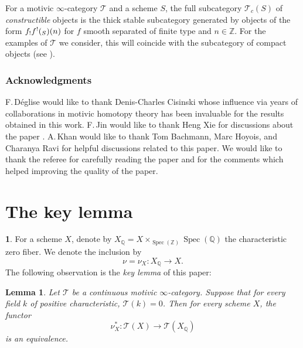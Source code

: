 \documentclass[11pt]{article}
\makeatletter
\numberwithin{equation}{section}\renewcommand{\encodingdefault}{TU}
\DeclareRobustCommand{\mathbbm}[1]{\csname jepbb@#1\endcsname}
\newcommand{\T}{\mathscr T}
\newcommand{\un}{\mathbbm 1}
\DeclareMathOperator{\spec}{Spec}
\newcommand{\ZZ} {\mathbb Z}
\newcommand{\QQ} {\mathbb Q}
\newtheorem{lm}[thm]{Lemma}
\theoremstyle{remark}
\theoremstyle{definition}
\newtheorem{num}[thm]{}
\numberwithin{equation}{thm}
\makeatother
\begin{document}
For a motivic $\infty$-category $\T$ and a scheme $S$, the full subcategory $\T_c(S)$ of \emph{constructible} objects is the thick stable subcategory generated by objects of the form $f_!f^!(\un_S)(n)$ for $f$ smooth separated of finite type and $n \in \ZZ$.
For the examples of $\T$ we consider, this will coincide with the subcategory of compact objects (see \cite[Prop.\,1.4.11]{CD3}).

\subsubsection*{Acknowledgments}
F.\,Déglise would like to thank Denis-Charles Cisinski whose influence via years of collaborations in motivic homotopy theory
has been invaluable for the results obtained in this work.
F.\,Jin would like to thank Heng Xie for discussions about the paper \cite{Jacobson}.
A.\,Khan would like to thank Tom Bachmann, Marc Hoyois, and Charanya Ravi for helpful discussions related to this paper. We would like to thank the referee for carefully reading the paper and for the comments which helped improving the quality of the paper.

\section{The key lemma}
\label{sec:key}

\begin{num}\label{num:zero_part}
For a scheme $X$, denote by $X_\QQ = X\times_{\spec(\ZZ)}\spec(\QQ)$ the characteristic zero fiber.
We denote the inclusion by
\begin{equation*}
\nu = \nu_X : X_\QQ \to X.
\end{equation*}
The following observation is the \textit{key lemma} of this paper:
\end{num}

\begin{lm}
\label{lm:fiber_Q_eq}
Let $\T$ be a continuous motivic $\infty$-category.
Suppose that for every field $k$ of positive characteristic, $\T(k)=0$.
Then for every scheme $X$, the functor
\[
\nu_X^*:\T(X)\to\T(X_\QQ)
\]
is an equivalence.
\end{lm}
\end{document}
